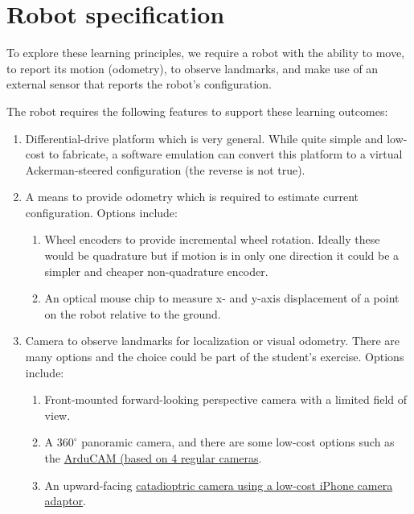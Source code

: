 \documentclass[11pt,fleqn]{article}
\begin{document}
\section{Robot specification}
To explore these learning principles, we require a robot with the ability to move, to report its motion (odometry), to observe landmarks, and make use of an external sensor that reports the robot's configuration.

The robot requires the following features to support these learning outcomes:
\begin{enumerate}
\item Differential-drive platform which is very general.  While quite simple and low-cost to fabricate, 
a software emulation can convert this platform to a virtual Ackerman-steered configuration (the reverse is not true).  
\item A means to provide odometry which is required to estimate current configuration.  Options include:
\begin{enumerate}
  \item Wheel encoders to provide incremental wheel rotation. Ideally these would be quadrature but if motion is in only one direction it could be a simpler and cheaper non-quadrature encoder.
  \item An optical mouse chip to measure x- and y-axis displacement of a point on the robot relative to the ground.  %
\end{enumerate}

\item Camera to observe landmarks for localization or visual odometry.  There are many options and the choice could be part of the
student's exercise. Options include:
\begin{enumerate}
  \item Front-mounted forward-looking perspective camera with a limited field of view.
  \item A $360^\circ$ panoramic camera, and there are some low-cost options such as the \href{https://www.robotshop.com/en/arducam-arduino-panorama-360-shield.html?gclid=CjwKCAjwzenbBRB3EiwAItS-u6KTmb5BQqjRGf7BO9a-Hu-UunogtEtZXQYSLflw6E3C5bTaU5SCERoCFZEQAvD_BwE}{ArduCAM (based on 4 regular cameras}.
  \item  An upward-facing \href{https://www.raspberrypi.org/magpi/building-a-raspberry-pi-360-camera/}{catadioptric camera using a low-cost iPhone camera adaptor}.
\end{enumerate}


\end{enumerate}
\end{document}
